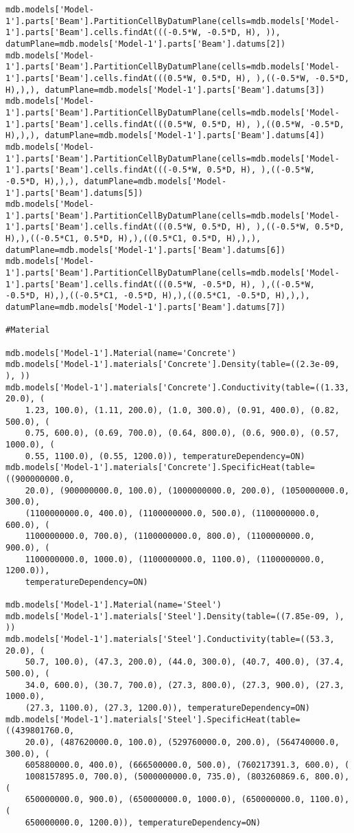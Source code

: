 \documentclass[12pt, letterpaper, oneside]{report}
\begin{document}
\begin{lstlisting}[frame=none]
mdb.models['Model-1'].parts['Beam'].PartitionCellByDatumPlane(cells=mdb.models['Model-1'].parts['Beam'].cells.findAt(((-0.5*W, -0.5*D, H), )), datumPlane=mdb.models['Model-1'].parts['Beam'].datums[2])
mdb.models['Model-1'].parts['Beam'].PartitionCellByDatumPlane(cells=mdb.models['Model-1'].parts['Beam'].cells.findAt(((0.5*W, 0.5*D, H), ),((-0.5*W, -0.5*D, H),),), datumPlane=mdb.models['Model-1'].parts['Beam'].datums[3])
mdb.models['Model-1'].parts['Beam'].PartitionCellByDatumPlane(cells=mdb.models['Model-1'].parts['Beam'].cells.findAt(((0.5*W, 0.5*D, H), ),((0.5*W, -0.5*D, H),),), datumPlane=mdb.models['Model-1'].parts['Beam'].datums[4])
mdb.models['Model-1'].parts['Beam'].PartitionCellByDatumPlane(cells=mdb.models['Model-1'].parts['Beam'].cells.findAt(((-0.5*W, 0.5*D, H), ),((-0.5*W, -0.5*D, H),),), datumPlane=mdb.models['Model-1'].parts['Beam'].datums[5])
mdb.models['Model-1'].parts['Beam'].PartitionCellByDatumPlane(cells=mdb.models['Model-1'].parts['Beam'].cells.findAt(((0.5*W, 0.5*D, H), ),((-0.5*W, 0.5*D, H),),((-0.5*C1, 0.5*D, H),),((0.5*C1, 0.5*D, H),),), datumPlane=mdb.models['Model-1'].parts['Beam'].datums[6])
mdb.models['Model-1'].parts['Beam'].PartitionCellByDatumPlane(cells=mdb.models['Model-1'].parts['Beam'].cells.findAt(((0.5*W, -0.5*D, H), ),((-0.5*W, -0.5*D, H),),((-0.5*C1, -0.5*D, H),),((0.5*C1, -0.5*D, H),),), datumPlane=mdb.models['Model-1'].parts['Beam'].datums[7])

#Material

mdb.models['Model-1'].Material(name='Concrete')
mdb.models['Model-1'].materials['Concrete'].Density(table=((2.3e-09, ), ))
mdb.models['Model-1'].materials['Concrete'].Conductivity(table=((1.33, 20.0), (
    1.23, 100.0), (1.11, 200.0), (1.0, 300.0), (0.91, 400.0), (0.82, 500.0), (
    0.75, 600.0), (0.69, 700.0), (0.64, 800.0), (0.6, 900.0), (0.57, 1000.0), (
    0.55, 1100.0), (0.55, 1200.0)), temperatureDependency=ON)
mdb.models['Model-1'].materials['Concrete'].SpecificHeat(table=((900000000.0, 
    20.0), (900000000.0, 100.0), (1000000000.0, 200.0), (1050000000.0, 300.0), 
    (1100000000.0, 400.0), (1100000000.0, 500.0), (1100000000.0, 600.0), (
    1100000000.0, 700.0), (1100000000.0, 800.0), (1100000000.0, 900.0), (
    1100000000.0, 1000.0), (1100000000.0, 1100.0), (1100000000.0, 1200.0)), 
    temperatureDependency=ON)

mdb.models['Model-1'].Material(name='Steel')
mdb.models['Model-1'].materials['Steel'].Density(table=((7.85e-09, ), ))
mdb.models['Model-1'].materials['Steel'].Conductivity(table=((53.3, 20.0), (
    50.7, 100.0), (47.3, 200.0), (44.0, 300.0), (40.7, 400.0), (37.4, 500.0), (
    34.0, 600.0), (30.7, 700.0), (27.3, 800.0), (27.3, 900.0), (27.3, 1000.0), 
    (27.3, 1100.0), (27.3, 1200.0)), temperatureDependency=ON)
mdb.models['Model-1'].materials['Steel'].SpecificHeat(table=((439801760.0, 
    20.0), (487620000.0, 100.0), (529760000.0, 200.0), (564740000.0, 300.0), (
    605880000.0, 400.0), (666500000.0, 500.0), (760217391.3, 600.0), (
    1008157895.0, 700.0), (5000000000.0, 735.0), (803260869.6, 800.0), (
    650000000.0, 900.0), (650000000.0, 1000.0), (650000000.0, 1100.0), (
    650000000.0, 1200.0)), temperatureDependency=ON)


\end{lstlisting}
\end{document}
